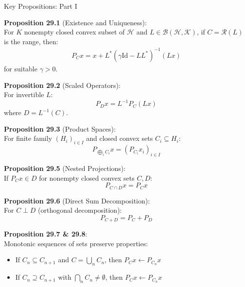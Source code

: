 \documentclass[aspectratio=169,10pt]{beamer}
\begin{document}
\begin{frame}[allowframebreaks]{Key Propositions: Part I}

    \textbf{Proposition 29.1} (Existence and Uniqueness):\\
    For $K$ nonempty closed convex subset of $\mathcal{H}$ and $L \in \mathcal{B}(\mathcal{H}, \mathcal{K})$, if $C = \mathcal{R}(L)$ is the range, then:
    \begin{align*}
    P_C x = x + L^*(\gamma \text{Id} - L L^*)^{-1}(Lx)
    \end{align*}
    for suitable $\gamma > 0$.

    \vspace{0.5cm}

    \textbf{Proposition 29.2} (Scaled Operators):\\
    For invertible $L$:
    $$P_D x = L^{-1} P_C(Lx)$$
    where $D = L^{-1}(C)$.

    \vspace{0.5cm}

    \textbf{Proposition 29.3} (Product Spaces):\\
    For finite family $(H_i)_{i \in I}$ and closed convex sets $C_i \subseteq H_i$:
    $$P_{\bigoplus_i C_i} x = (P_{C_i} x_i)_{i \in I}$$

    \framebreak

    \textbf{Proposition 29.5} (Nested Projections):\\
    If $P_C x \in D$ for nonempty closed convex sets $C, D$:
    $$P_{C \cap D} x = P_C x$$

    \vspace{0.5cm}

    \textbf{Proposition 29.6} (Direct Sum Decomposition):\\
    For $C \perp D$ (orthogonal decomposition):
    $$P_{C+D} = P_C + P_D$$

    \vspace{0.5cm}

    \textbf{Proposition 29.7 \& 29.8}:\\
    Monotonic sequences of sets preserve properties:
    \begin{itemize}
        \item If $C_n \subseteq C_{n+1}$ and $C = \bigcup_n C_n$, then $P_C x \leftarrow P_{C_n} x$
        \item If $C_n \supseteq C_{n+1}$ with $\bigcap_n C_n \neq \emptyset$, then $P_C x \leftarrow P_{C_n} x$
    \end{itemize}

\end{frame}
\end{document}
